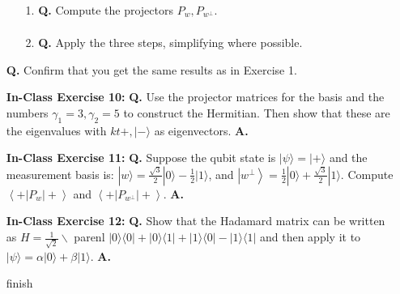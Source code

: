 \documentclass[main.tex]{subfiles}
\begin{document}
\begin{enumerate}
    \begin{enumerate}
        \item[1.] \textbf{Q.} Compute the projectors $P_{w}, P_{w^{\perp}}$.
        \begin{align*}
            
        \end{align*}
        \item[2.] \textbf{Q.} Apply the three steps, simplifying where possible.
    \end{enumerate}
    
     \textbf{Q.} Confirm that you get the same results as in Exercise 1.

\item[] \textbf{In-Class Exercise 10:}  \textbf{Q.} Use the projector matrices for the basis and the numbers $\gamma_{1}=3, \gamma_{2}=5$ to construct the Hermitian. Then show that these are the eigenvalues with $k t+,|-\rangle$ as eigenvectors.  \textbf{A.}

\item[] \textbf{In-Class Exercise 11:}  \textbf{Q.} Suppose the qubit state is $|\psi\rangle=|+\rangle$ and the measurement basis is: $|w\rangle=\frac{\sqrt{3}}{2}|0\rangle-\frac{1}{2}|1\rangle$, and $\left|w^{\perp}\right\rangle=\frac{1}{2}|0\rangle+\frac{\sqrt{3}}{2}|1\rangle .$ Compute $\left\langle+\left|P_{w}\right|+\right\rangle$ and $\left\langle+\left|P_{w^{\perp}}\right|+\right\rangle .$  \textbf{A.}

\item[] \textbf{In-Class Exercise 12:}  \textbf{Q.} Show that the Hadamard matrix can be written as $H=\frac{1}{\sqrt{2}} \backslash$ parenl $|0\rangle\langle 0|+| 0\rangle\langle 1|+| 1\rangle\langle 0|-| 1\rangle\langle 1|$ and then apply it to $|\psi\rangle=\alpha|0\rangle+\beta|1\rangle .$  \textbf{A.}

finish

\end{enumerate}
\end{document}
